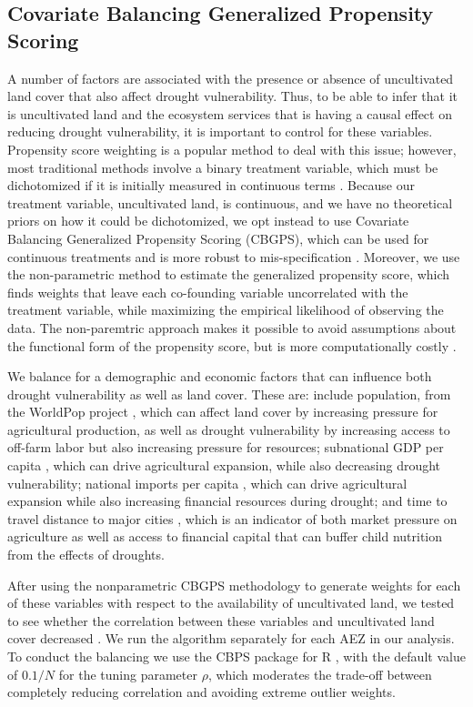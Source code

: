 \documentclass{article}
\begin{document}
\subsection{Covariate Balancing Generalized Propensity Scoring}
A number of factors are associated with the presence or absence of uncultivated land cover that also affect drought vulnerability.  Thus, to be able to infer that it is uncultivated land and the ecosystem services that is having a causal effect on reducing drought vulnerability, it is important to control for these variables.  Propensity score weighting is a popular method to deal with this issue; however, most traditional methods involve a binary treatment variable, which must be dichotomized if it is initially measured in continuous terms \cite{Hirano2003, Robins2000}.  Because our treatment variable, uncultivated land, is continuous, and we have no theoretical priors on how it could be dichotomized, we opt instead to use Covariate Balancing Generalized Propensity Scoring (CBGPS), which can be used for continuous treatments and is more robust to mis-specification \cite{Fong2018}.  Moreover, we use the non-parametric method to estimate the generalized propensity score, which finds weights that leave each co-founding variable uncorrelated with the treatment variable, while maximizing the empirical likelihood of observing the data.  The non-paremtric approach makes it possible to avoid assumptions about the functional form of the propensity score, but is more computationally costly \cite{Fong2018}.

We balance for a demographic and economic factors that can influence both drought vulnerability as well as land cover.  These are: include population, from the WorldPop project \cite{Tatem2017}, which can affect land cover by increasing pressure for agricultural production, as well as drought vulnerability by increasing access to off-farm labor but also increasing pressure for resources; subnational GDP per capita \cite{Kummu2018}, which can drive agricultural expansion, while also decreasing drought vulnerability; national imports per capita \cite{WorldBank2017}, which can drive agricultural expansion \cite{Meyfroidt2013} while also increasing financial resources during drought; and time to travel distance to major cities \cite{Weiss2018, Uchida2008}, which is an indicator of both market pressure on agriculture as well as access to financial capital that can buffer child nutrition from the effects of droughts.

After using the nonparametric CBGPS methodology to generate weights for each of these variables with respect to the availability of uncultivated land, we tested to see whether the correlation between these variables and uncultivated land cover decreased \cite{Fong2018}.  We run the algorithm separately for each AEZ in our analysis.  To conduct the balancing we use the CBPS package for R \cite{Fong2018a}, with the default value of $0.1/N$ for the tuning parameter $\rho$, which moderates the trade-off between completely reducing correlation and avoiding extreme outlier weights.
\end{document}
